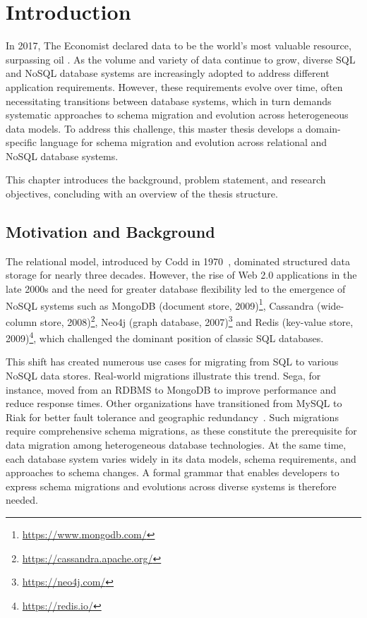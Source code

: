 \chapter{Introduction}
\label{ch:background}
In 2017, The Economist declared data to be the world's most valuable resource, surpassing oil \cite{economist2017data}. As the volume and variety of data continue to grow, diverse SQL and NoSQL database systems are increasingly adopted to address different application requirements. However, these requirements evolve over time, often necessitating transitions between database systems, which in turn demands systematic approaches to schema migration and evolution across heterogeneous data models. To address this challenge, this master thesis develops a domain-specific language for schema migration and evolution across relational and NoSQL database systems.

This chapter introduces the background, problem statement, and research objectives, concluding with an overview of the thesis structure.

%
%
\section{Motivation and Background}
\label{sec:background:first_section}
The relational model, introduced by Codd in 1970~\cite{codd1970relational}, dominated structured data storage for nearly three decades. However, the rise of Web 2.0 applications in the late 2000s and the need for greater database flexibility led to the emergence of NoSQL systems such as MongoDB (document store, 2009)\footnote{\url{https://www.mongodb.com/}}, Cassandra (wide-column store, 2008)\footnote{\url{https://cassandra.apache.org/}}, Neo4j (graph database, 2007)\footnote{\url{https://neo4j.com/}} and Redis (key-value store, 2009)\footnote{\url{https://redis.io/}}, which challenged the dominant position of classic SQL databases.

This shift has created numerous use cases for migrating from SQL to various NoSQL data stores. Real-world migrations illustrate this trend. Sega, for instance, moved from an RDBMS to MongoDB to improve performance and reduce response times. Other organizations have transitioned from MySQL to Riak for better fault tolerance and geographic redundancy~\cite{bansal2021journey}. Such migrations require comprehensive schema migrations, as these constitute the prerequisite for data migration among heterogeneous database technologies. At the same time, each database system varies widely in its data models, schema requirements, and approaches to schema changes. A formal grammar that enables developers to express schema migrations and evolutions across diverse systems is therefore needed.

